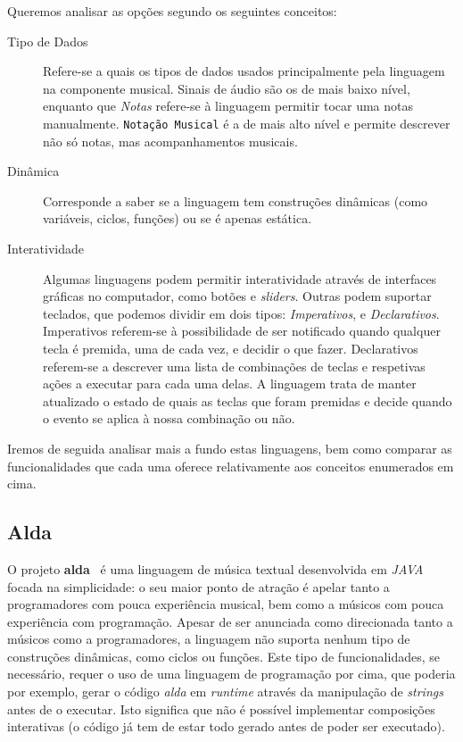 Queremos analisar as opções segundo os seguintes conceitos:
\begin{description}
 \item[Tipo de Dados] Refere-se a quais os tipos de dados usados principalmente pela linguagem na componente musical. Sinais de áudio são os de mais baixo nível, enquanto que \textit{Notas} refere-se à linguagem permitir tocar uma notas manualmente. \texttt{Notação Musical} é a de mais alto nível e permite descrever não só notas, mas acompanhamentos musicais.
 \item[Dinâmica] Corresponde a saber se a linguagem tem construções dinâmicas (como variáveis, ciclos, funções) ou se é apenas estática.
 \item[Interatividade] Algumas linguagens podem permitir interatividade através de interfaces gráficas no computador, como botões e \textit{sliders}. Outras podem suportar teclados, que podemos dividir em dois tipos: \textit{Imperativos}, e \textit{Declarativos}. Imperativos referem-se à possibilidade de ser notificado quando qualquer tecla é premida, uma de cada vez, e decidir o que fazer. Declarativos referem-se a descrever uma lista de combinações de teclas e respetivas ações a executar para cada uma delas. A linguagem trata de manter atualizado o estado de quais as teclas que foram premidas e decide quando o evento se aplica à nossa combinação ou não.
\end{description}


Iremos de seguida analisar mais a fundo estas linguagens, bem como comparar as funcionalidades que cada uma oferece relativamente aos conceitos enumerados em cima.
\subsection{Alda}
O projeto \textbf{alda}~\citep{alda} é uma linguagem de música textual desenvolvida em \textit{JAVA} focada na simplicidade: o seu maior ponto de atração é apelar tanto a programadores com pouca experiência musical, bem como a músicos com pouca experiência com programação.
Apesar de ser anunciada como direcionada tanto a músicos como a programadores, a linguagem não suporta nenhum tipo de construções dinâmicas, como ciclos ou funções. Este tipo de funcionalidades, se necessário, requer o uso de uma linguagem de programação por cima, que poderia por exemplo, gerar o código \textit{alda} em \textit{runtime} através da manipulação de \textit{strings} antes de o executar. Isto significa que não é possível implementar composições interativas (o código já tem de estar todo gerado antes de poder ser executado).

